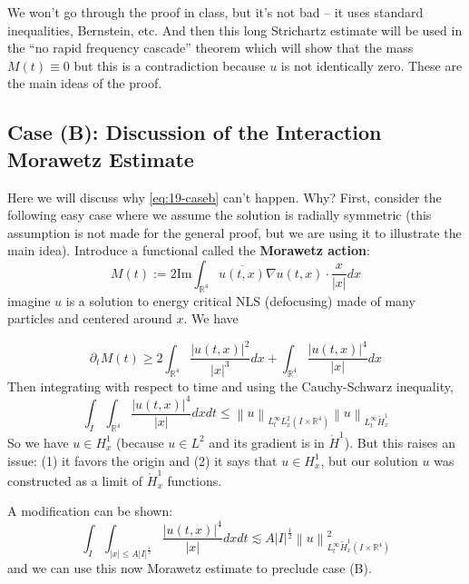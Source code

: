\documentclass{article}
\def\R{\mathbb{R}} %
\newcommand\norm[1]{\left\lVert#1\right\rVert}
\begin{document}
We won't go through the proof in class, but it's not bad -- it uses standard
inequalities, Bernstein, etc. And then this long Strichartz estimate will be
used in the ``no rapid frequency cascade'' theorem which will show that the mass
$M(t)\equiv 0$ but this is a contradiction because $u$ is not identically zero.
These are the main ideas of the proof.

\subsection{Case (B): Discussion of the Interaction Morawetz Estimate}
Here we will discuss why \cref{eq:19-caseb} can't happen. Why? First, consider
the following easy case where we assume the solution is radially symmetric (this
assumption is not made for the general proof, but we are using it to illustrate
the main idea).  Introduce a functional called the \textbf{Morawetz action}:
\begin{equation*}
  M(t) := 2 \mathrm{Im} \int_{\R^{4}}\overline{u(t,x)}\nabla u(t,x) \cdot \frac{x}{|x|}dx
\end{equation*}
imagine $u$ is a solution to energy critical NLS (defocusing) made of many
particles and centered around $x$. We have

\begin{equation*}
  \partial_{t}M(t) 
  \geq 2 \int_{\R^{4}} \frac{\left| u(t,x) \right|^{2}}{|x|^{3}}dx
  + \int_{\R^{4}} \frac{\left| u(t,x) \right|^{4}}{|x|}dx  
\end{equation*}
Then integrating with respect to time and using the Cauchy-Schwarz inequality, 
\begin{equation*}
  \int_{I}\int_{\R^{4}} \frac{\left| u(t,x) \right|^{4}}{|x|}dxdt 
  \leq \norm{u}_{L^{\infty}_{t}L_{x}^{2}(I \times \R^{4})} \norm{u}_{L^{\infty}_{t}\mathring{H}_{x}^{1}}
\end{equation*}
So we have $u\in H_{x}^{1}$ (because $u\in L^{2}$ and its gradient is in
$\mathring{H}^{1}$). But this raises an issue: (1) it favors the origin and (2)
it says that $u\in H_{x}^{1}$, but our solution $u$ was constructed
as a limit of $\mathring{H}_{x}^{1}$ functions.

A modification can be shown:
\begin{equation*}
  \int_{I}\int_{|x| \leq A |I|^{\frac{1}{2}}} \frac{\left| u(t,x) \right|^{4}}{|x|}dxdt 
  \lesssim A|I|^{\frac{1}{2}} \norm{u}_{L_{t}^{\infty}\mathring{H}_{x}^{1}(I\times \R^{4})}^{2}
\end{equation*}
and we can use this now Morawetz estimate to preclude case (B).
\end{document}
